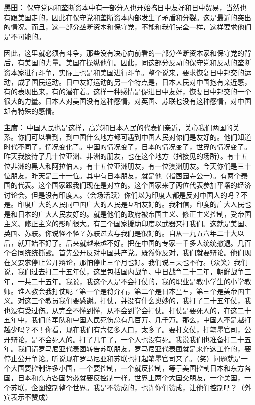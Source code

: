 \begin{list}{}
\item[\textbf{黑田：}] 保守党内和垄断资本中有一部分人也开始搞日中友好和日中贸易，当然也有跟美国走的，因此在保守党和垄断资本内部发生了矛盾和分裂。这是最近的突出的情况。而且，这一部分垄断资本和保守党，不能和我们完全一样，这样要求他们是不可能的。

因此，这里就必须有斗争，那些没有决心向前看的一部分垄断资本家和保守党的背后，有美国的力量。美国在操纵他们。因此，同这部分反动的保守党和反动的垄断资本家进行斗争，实际上也是和美国进行斗争。整个说来，要求恢复日中邦交的运动，成了国民运动。日中友好运动的另一个特点是，日本人民对中国抱有亲近感，有的表现出来，有的潜在着。这样一种感情是促进日中友好，恢复日中邦交的一个很大的力量。日本人对美国没有这种感情，对英国、苏联也没有这种感情，对中国却有特殊的感情。

\item[\textbf{主席：}] 中国人民也是这样，高兴和日本人民的代表们亲近，关心我们两国的关系。你们可以看到，到中国什么地方都可遇到中国人民对你们是友好的。他们知道时代不同了，情况变化了。中国的情况变了，日本的情况变了，世界的情况变了。昨天我接待了几十位亚洲、非洲的朋友，也在这个地方（指接见的场所）。有十五位非洲的黑人和阿拉伯人，有十五位亚洲朋友，有一位澳洲朋友。今天你们是三十位朋友，昨天是三十一位。其中有日本朋友，就是他（指西园寺公一）。有两个泰国的代表。这个国家跟我们现在是对立的。这个国家来了两位代表参加平壤的经济讨论会。但是没有印度人。（会场活跃）你们以为印度人都是反对中国人的吗？不是。印度广大的人民同中国广大的人民是互相友好的。我相信，印度的广大人民也是和日本的广大人民友好的。就是他们的政府被帝国主义、修正主义控制，受帝国主义、修正主义的影响很大。有三个国家援助印度以武器来打我们。这就是美国、英国、苏联。你说怪不怪？苏联过去与我们是很好的。自从一九五六年二十大以后，就开始不好了。后来就越来越不好。把在中国的专家一千多人统统撤退。几百个合同统统撕毁。首先公开反对中国共产党。既然你反对，我们就要辩论。他们现在又要求停止公开辩论，那怕停止三个月也好。我们说三天也不行。（众笑）我们说，我们过去打二十五年仗，这里包括国内战争、中日战争二十二年，朝鲜战争三年，一共二十五年。我说，我这个人是不会打仗的，我的职业是教小学生的小学教师。谁人教会我打仗呢？第一个是蒋介石，第二个是日本皇军，第三个是美帝国主义。对这三个教员我们要感谢。打仗，并没有什么奥妙的，我打了二十五年仗，我也没有受过伤。从完全不懂到懂，从不会到学会打仗。打仗是要死人的，在这二十五年中，我们的军队和中国人民死伤总有几百万、几千万。那么，中国人不是越打越少吗？不！你看，现在我们有六亿多人口，太多了。要打文仗，打笔墨官司，公开辩论，是不会死人的。打了几年了，一个人也没有死。我说我们也准备打二十五年。我们请罗马尼亚代表团转告苏联朋友。罗马尼亚代表团就是来作这工作的，要停止公开争论。听说现在罗马尼亚和苏联也打起笔墨官司来了。（笑）问题就是一个大国要控制许多小国，一个要控制，一个就反控制，等于美国控制日本和东方各国，日本和东方各国势必就要反控制一样。世界上两个大国交朋友，一个美国，一个苏联，企图控制整个世界。我是不赞成的，也许你们赞成，让他们控制吧？（外宾表示不赞成）


\end{list}
